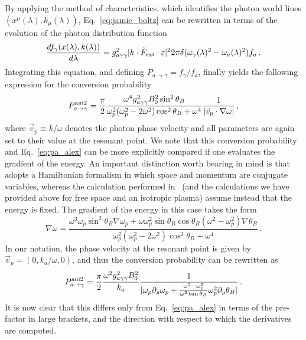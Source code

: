 \documentclass[twocolumn,superscriptaddress,floatfix,preprintnumbers,prd,nofootinbib,aps,10pt]{revtex4-2}
\renewcommand\({\left(}
\renewcommand\){\right)}
\renewcommand\[{\left[}
\renewcommand\]{\right]}
\begin{document}
By applying the method of characteristics, which identifies the photon world lines $(x^\mu(\lambda), k_\mu(\lambda))$, Eq.~\ref{eq:jamie_boltz} can be rewritten in terms of the evolution of the photon distribution function
%
\begin{equation}
    \frac{df_\gamma(x(\lambda), k(\lambda))}{d\lambda} = g_{a\gamma\gamma}^2 |k \cdot \tilde{F}_{\rm ext} \cdot \varepsilon|^2 2\pi \delta(\omega_\gamma(\lambda)^2 - \omega_a(\lambda)^2) f_a \, .
\end{equation}
%
Integrating this equation, and defining $P_{a\rightarrow \gamma} = f_\gamma / f_a$, finally yields the following expression for the conversion probability~\cite{mcdonald2023axionphoton}
%
\begin{equation}\label{eq:pa_jamie}
    P_{a \rightarrow \gamma}^{\rm ani2} = \frac{\pi}{2} \frac{\omega^4 g_{a\gamma\gamma}^2 B_0^2 \sin^2\theta_B}{\omega_p^2(\omega_p^2 - 2 \omega^2) \cos^2\theta_B + \omega^4} \frac{1}{|\vec{v}_p \cdot \nabla \omega |} \, ,
\end{equation}
%
where $\vec{v}_p \equiv k / \omega$ denotes the photon phase velocity and all parameters are again set to their value at the resonant point. We note that this conversion probability and Eq.~\ref{eq:pa_alex} can be more explicitly compared if one evaluates the gradient of the energy. An important distinction worth bearing in mind is that~\cite{mcdonald2023axionphoton} adopts a Hamiltonian formalism in which space and momentum are conjugate variables, whereas the calculation performed in~\cite{millar2021axionphotonUPDATED} (and the calculations we have provided above for free space and an isotropic plasma) assume instead that the energy is fixed. The gradient of the energy in this case takes the form
%
\begin{equation}
    \nabla \omega = \frac{\omega^3 \omega_p \sin^2\theta_B \nabla \omega_p + \omega \omega_p^2 \sin\theta_B \cos\theta_B(\omega^2 - \omega_p^2) \nabla \theta_B}{\omega_p^2(\omega_p^2 - 2\omega^2)\cos^2\theta_B + \omega^4} \, .
\end{equation}
%
In our notation, the phase velocity at the resonant point is given by $\vec{v}_p = (0, k_a / \omega, 0)$, and thus the conversion probability can be rewritten as
%
\begin{equation}\label{eq:pani2}
    P_{a \rightarrow \gamma}^{\rm ani2} = \frac{\pi}{2} \frac{\omega^2 g_{a\gamma\gamma}^2 B_0^2}{k_a} \frac{1}{|\omega_p \partial_y \omega_p + \frac{\omega^2 - \omega_p^2}{\omega^2 \tan\theta_B} \omega_p^2 \partial_y \theta_B|} \, .
\end{equation}
%
It is now clear that this differs only from Eq.~\ref{eq:pa_alex} in terms of the pre-factor in large brackets, and the direction with respect to which the derivatives are computed.
\end{document}
